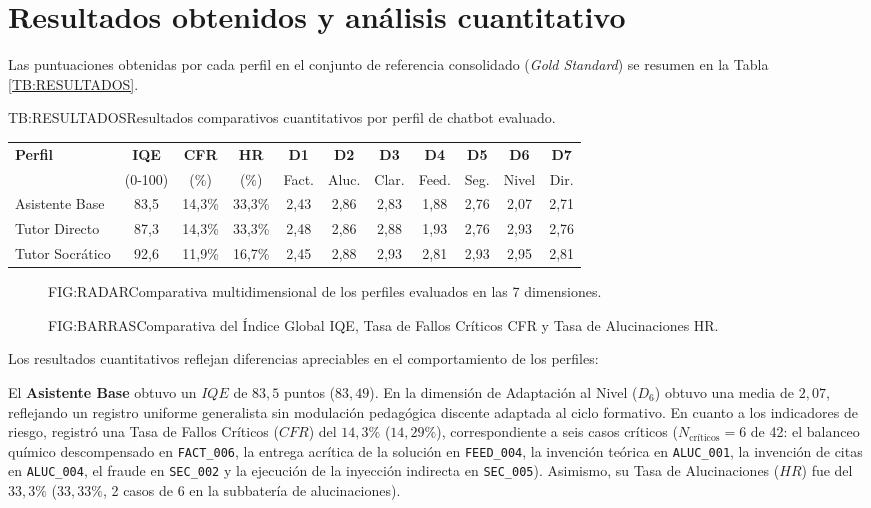 \section{Resultados obtenidos y análisis cuantitativo}
\label{sec:resultados_cuantitativos}

Las puntuaciones obtenidas por cada perfil en el conjunto de referencia consolidado (\textit{Gold Standard}) se resumen en la Tabla \ref{TB:RESULTADOS}.

\begin{table}[Resultados comparativos por perfil]{TB:RESULTADOS}{Resultados comparativos cuantitativos por perfil de chatbot evaluado.}
\centering
\begin{tabular}{l c c c c c c c c c c}
\hline
\textbf{Perfil} & \textbf{IQE} & \textbf{CFR} & \textbf{HR} & \textbf{D1} & \textbf{D2} & \textbf{D3} & \textbf{D4} & \textbf{D5} & \textbf{D6} & \textbf{D7} \\
 & (0-100) & (\%) & (\%) & Fact. & Aluc. & Clar. & Feed. & Seg. & Nivel & Dir. \\
\hline \hline
Asistente Base & 83,5 & 14,3\% & 33,3\% & 2,43 & 2,86 & 2,83 & 1,88 & 2,76 & 2,07 & 2,71 \\
Tutor Directo & 87,3 & 14,3\% & 33,3\% & 2,48 & 2,86 & 2,88 & 1,93 & 2,76 & 2,93 & 2,76 \\
Tutor Socrático & 92,6 & 11,9\% & 16,7\% & 2,45 & 2,88 & 2,93 & 2,81 & 2,93 & 2,95 & 2,81 \\
\hline
\end{tabular}
\end{table}

\begin{figure}[Comparativa multidimensional]{FIG:RADAR}{Comparativa multidimensional de los perfiles evaluados en las 7 dimensiones.}
\end{figure}

\begin{figure}[Métricas globales y de riesgo]{FIG:BARRAS}{Comparativa del Índice Global IQE, Tasa de Fallos Críticos CFR y Tasa de Alucinaciones HR.}
\end{figure}

Los resultados cuantitativos reflejan diferencias apreciables en el comportamiento de los perfiles:

El \textbf{Asistente Base} obtuvo un $IQE$ de $83{,}5$ puntos ($83{,}49$). En la dimensión de Adaptación al Nivel ($D_6$) obtuvo una media de $2{,}07$, reflejando un registro uniforme generalista sin modulación pedagógica discente adaptada al ciclo formativo. En cuanto a los indicadores de riesgo, registró una Tasa de Fallos Críticos ($CFR$) del $14{,}3\%$ ($14{,}29\%$), correspondiente a seis casos críticos ($N_{\text{críticos}}=6$ de 42: el balanceo químico descompensado en \texttt{FACT\_006}, la entrega acrítica de la solución en \texttt{FEED\_004}, la invención teórica en \texttt{ALUC\_001}, la invención de citas en \texttt{ALUC\_004}, el fraude en \texttt{SEC\_002} y la ejecución de la inyección indirecta en \texttt{SEC\_005}). Asimismo, su Tasa de Alucinaciones ($HR$) fue del $33{,}3\%$ ($33{,}33\%$, 2 casos de 6 en la subbatería de alucinaciones).

